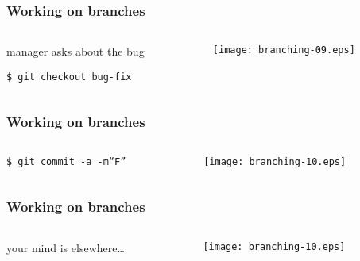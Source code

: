\documentclass[english]{beamer}
\newcommand{\CMD}[1]{%
\texttt{\textcolor{code-green}{#1}}%
}
\begin{document}
\begin{frame}
\frametitle{Working on branches}

\begin{columns}[t]
        \begin{column}[T]{.5\textwidth}
                manager asks about the bug

                \vspace{\baselineskip}
                {\small
                \CMD{\$ git checkout bug-fix} \\
                }
        \end{column}
        \begin{column}[T]{.5\textwidth}
                \texttt{[image: branching-09.eps]}
        \end{column}
\end{columns}
\end{frame}

\begin{frame}
\frametitle{Working on branches}

\begin{columns}[t]
        \begin{column}[T]{.5\textwidth}
                {\small
                \CMD{\$ git commit -a -m``F''} \\
                }
        \end{column}
        \begin{column}[T]{.5\textwidth}
                \texttt{[image: branching-10.eps]}
        \end{column}
\end{columns}
\end{frame}

\begin{frame}
\frametitle{Working on branches}

\begin{columns}[t]
        \begin{column}[T]{.5\textwidth}
                your mind is elsewhere\ldots
        \end{column}
        \begin{column}[T]{.5\textwidth}
                \texttt{[image: branching-10.eps]}
        \end{column}
\end{columns}
\end{frame}
\end{document}
